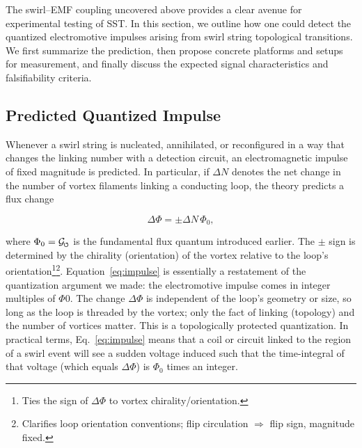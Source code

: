 \documentclass[12pt]{article}
\DeclareRobustCommand{\swirlarrow}{
\mathchoice{\mkern-2mu\scriptstyle\boldsymbol{\circlearrowleft}}%
{\mkern-2mu\scriptstyle\boldsymbol{\circlearrowleft}}%
{\mkern-2mu\scriptscriptstyle\boldsymbol{\circlearrowleft}}%
{\mkern-2mu\scriptscriptstyle\boldsymbol{\circlearrowleft}}
}%
\newcommand{\Gswirl}{\mathcal{G}_{\swirlarrow}}
\begin{document}
The swirl–EMF coupling uncovered above provides a clear avenue for experimental testing of SST. In this section, we outline how one could detect the quantized electromotive impulses arising from swirl string topological transitions. We first summarize the prediction, then propose concrete platforms and setups for measurement, and finally discuss the expected signal characteristics and falsifiability criteria.


\subsection{Predicted Quantized Impulse}\label{sec:prediction}

Whenever a swirl string is nucleated, annihilated, or reconfigured in a way that changes the linking number with a detection circuit, an electromagnetic impulse of fixed magnitude is predicted. In particular, if $\Delta N$ denotes the net change in the number of vortex filaments linking a conducting loop, the theory predicts a flux change

\begin{equation}\label{eq:impulse}

\Delta \Phi = \pm \Delta N \,\Phi_{0},
\end{equation}

where $\Phi_{0} = \Gswirl$ is the fundamental flux quantum introduced earlier. The $\pm$ sign is determined by the chirality (orientation) of the vortex relative to the loop’s orientation\footnote{Ties the sign of $\Delta\Phi$ to vortex chirality/orientation.}\footnote{Clarifies loop orientation conventions; flip circulation $\Rightarrow$ flip sign, magnitude fixed.}. Equation~\eqref{eq:impulse} is essentially a restatement of the quantization argument we made: the electromotive impulse comes in integer multiples of $\Phi{0}$. The change $\Delta \Phi$ is independent of the loop's geometry or size, so long as the loop is threaded by the vortex; only the fact of linking (topology) and the number of vortices matter. This is a topologically protected quantization. In practical terms, Eq.~\eqref{eq:impulse} means that a coil or circuit linked to the region of a swirl event will see a sudden voltage induced such that the time-integral of that voltage (which equals $\Delta \Phi$) is $\Phi_{0}$ times an integer.
\end{document}
